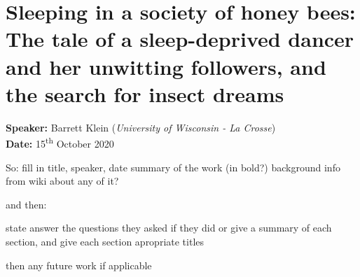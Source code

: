 \section{Sleeping in a society of honey bees: The tale of a sleep-deprived dancer and her unwitting followers, and the search for insect dreams}

\textbf{Speaker:} Barrett Klein (\textit{University of Wisconsin - La Crosse})\\
\textbf{Date:} \hspace{.53cm} 15\textsuperscript{th} October 2020
\vspace{.5cm}


So:
fill in title, speaker, date
summary of the work (in bold?)
background info from wiki about any of it?

and then:

state answer the questions they asked if they did
or give a summary of each section, and give each section apropriate titles

then any future work if applicable